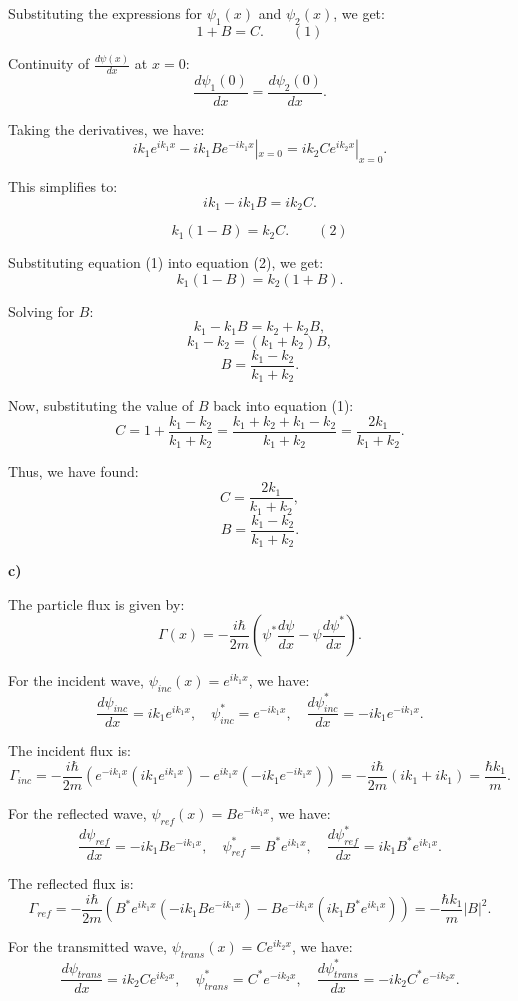 \documentclass{article}
\begin{document}
Substituting the expressions for $\psi_1(x)$ and $\psi_2(x)$, we get:
\[
1 + B = C. \qquad (1)
\]

Continuity of $\frac{d\psi(x)}{dx}$ at $x = 0$:
\[
\frac{d\psi_1(0)}{dx} = \frac{d\psi_2(0)}{dx}.
\]

Taking the derivatives, we have:
\[
ik_1e^{ik_1x} - ik_1Be^{-ik_1x} |_{x=0} = ik_2Ce^{ik_2x} |_{x=0}.
\]

This simplifies to:
\[
ik_1 - ik_1B = ik_2C.
\]

\[
k_1(1 - B) = k_2C. \qquad (2)
\]

Substituting equation (1) into equation (2), we get:
\[
k_1(1 - B) = k_2(1 + B).
\]

Solving for $B$:
\[
k_1 - k_1B = k_2 + k_2B,
\]
\[
k_1 - k_2 = (k_1 + k_2)B,
\]
\[
B = \frac{k_1 - k_2}{k_1 + k_2}.
\]

Now, substituting the value of $B$ back into equation (1):
\[
C = 1 + \frac{k_1 - k_2}{k_1 + k_2} = \frac{k_1 + k_2 + k_1 - k_2}{k_1 + k_2} = \frac{2k_1}{k_1 + k_2}.
\]

Thus, we have found:
\[
C = \frac{2k_1}{k_1 + k_2},
\]
\[
B = \frac{k_1 - k_2}{k_1 + k_2}.
\]

\textbf{c)}

The particle flux is given by:
\[
\Gamma(x) = -\frac{i\hbar}{2m} \left( \psi^* \frac{d\psi}{dx} - \psi \frac{d\psi^*}{dx} \right).
\]

For the incident wave, $\psi_{inc}(x) = e^{ik_1x}$, we have:
\[
\frac{d\psi_{inc}}{dx} = ik_1e^{ik_1x}, \quad \psi_{inc}^* = e^{-ik_1x}, \quad \frac{d\psi_{inc}^*}{dx} = -ik_1e^{-ik_1x}.
\]

The incident flux is:
\[
\Gamma_{inc} = -\frac{i\hbar}{2m} \left( e^{-ik_1x}(ik_1e^{ik_1x}) - e^{ik_1x}(-ik_1e^{-ik_1x}) \right) = -\frac{i\hbar}{2m} (ik_1 + ik_1) = \frac{\hbar k_1}{m}.
\]

For the reflected wave, $\psi_{ref}(x) = Be^{-ik_1x}$, we have:
\[
\frac{d\psi_{ref}}{dx} = -ik_1Be^{-ik_1x}, \quad \psi_{ref}^* = B^*e^{ik_1x}, \quad \frac{d\psi_{ref}^*}{dx} = ik_1B^*e^{ik_1x}.
\]

The reflected flux is:
\[
\Gamma_{ref} = -\frac{i\hbar}{2m} \left( B^*e^{ik_1x}(-ik_1Be^{-ik_1x}) - Be^{-ik_1x}(ik_1B^*e^{ik_1x}) \right) = -\frac{\hbar k_1}{m} |B|^2.
\]

For the transmitted wave, $\psi_{trans}(x) = Ce^{ik_2x}$, we have:
\[
\frac{d\psi_{trans}}{dx} = ik_2Ce^{ik_2x}, \quad \psi_{trans}^* = C^*e^{-ik_2x}, \quad \frac{d\psi_{trans}^*}{dx} = -ik_2C^*e^{-ik_2x}.
\]
\end{document}
